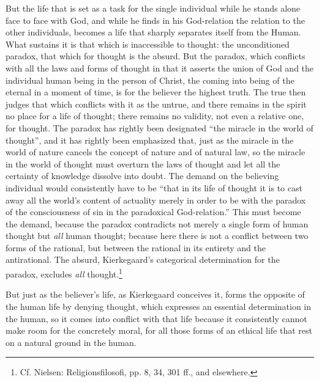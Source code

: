 \documentclass[12pt,a4paper,openany]{book}
\newcommand{\opage}[1]{\marginnote{\footnotesize\textit{[#1]}}}
\begin{document}
But the life that is set as a task for the single individual
while he stands alone face to face with God, and while
he finds in his God-relation the relation to the other individuals,
becomes a life that sharply separates itself from the Human.
What sustains it is that which is inaccessible to thought:
the unconditioned paradox, that which for thought is the absurd.
But the paradox, which conflicts with all the laws and
forms of thought in that it asserts the union of God and the individual
human being in the person of Christ, the coming into being of the eternal in a moment
of time, is for the believer the highest truth. The
true then judges that which conflicts with it as the
untrue, and there remains in the spirit no place for a life of
thought; there remains no validity, not even a relative one,
for thought. The paradox has rightly been designated
``the miracle in the world of thought'', and it has rightly been
emphasized that, just as the miracle in the world of nature cancels
the concept of nature and of natural law, so the miracle in
the world of thought must overturn the laws of thought and let all the
certainty of knowledge dissolve into doubt. The demand on the believing
individual would consistently have to be ``that in its life of thought it is to
cast away all the world's content of actuality merely in order to be with
the paradox of the consciousness of sin in the paradoxical God-relation.''
This must become the demand, because the paradox contradicts not merely
a single form of human thought but \emph{all} human
thought; because here there is not a conflict between two
forms of the rational, but between the rational in its
entirety and the antirational. The absurd, Kierkegaard's
categorical determination for the paradox, excludes \emph{all} thought.\footnote{Cf. Nielsen: Religionsfilosofi, pp. 8, 34, 301 ff., and elsewhere.}

\opage{437}But just as the believer's life, as Kierkegaard
conceives it, forms the opposite of the human life
by denying thought, which expresses an essential determination
in the human, so it comes into conflict with that life
because it consistently cannot make room for the concretely
moral, for all those forms of an ethical life that rest on
a natural ground in the human.
\end{document}
